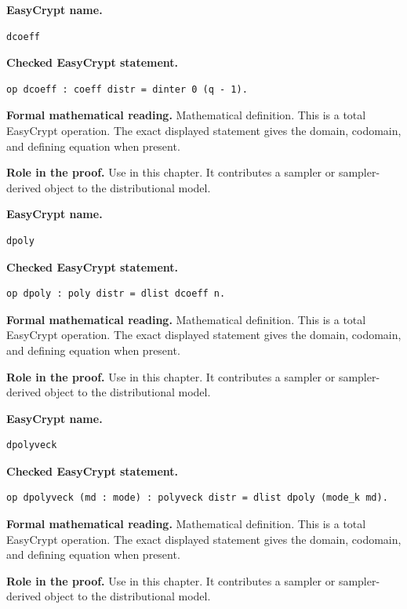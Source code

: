 \begin{formaldefinition}
\noindent\textbf{EasyCrypt name.}
\begin{lstlisting}[language=EasyCrypt,basicstyle=\ttfamily\scriptsize]
dcoeff
\end{lstlisting}
\noindent\textbf{Checked EasyCrypt statement.}
\begin{lstlisting}[language=EasyCrypt,basicstyle=\ttfamily\scriptsize]
op dcoeff : coeff distr = dinter 0 (q - 1).
\end{lstlisting}
\noindent\textbf{Formal mathematical reading.}
Mathematical definition. This is a total EasyCrypt operation.  The exact displayed statement gives the domain, codomain, and defining equation when present.

\noindent\textbf{Role in the proof.}
Use in this chapter. It contributes a sampler or sampler-derived object to the distributional model.

\end{formaldefinition}

\begin{formaldefinition}
\noindent\textbf{EasyCrypt name.}
\begin{lstlisting}[language=EasyCrypt,basicstyle=\ttfamily\scriptsize]
dpoly
\end{lstlisting}
\noindent\textbf{Checked EasyCrypt statement.}
\begin{lstlisting}[language=EasyCrypt,basicstyle=\ttfamily\scriptsize]
op dpoly : poly distr = dlist dcoeff n.
\end{lstlisting}
\noindent\textbf{Formal mathematical reading.}
Mathematical definition. This is a total EasyCrypt operation.  The exact displayed statement gives the domain, codomain, and defining equation when present.

\noindent\textbf{Role in the proof.}
Use in this chapter. It contributes a sampler or sampler-derived object to the distributional model.

\end{formaldefinition}

\begin{formaldefinition}
\noindent\textbf{EasyCrypt name.}
\begin{lstlisting}[language=EasyCrypt,basicstyle=\ttfamily\scriptsize]
dpolyveck
\end{lstlisting}
\noindent\textbf{Checked EasyCrypt statement.}
\begin{lstlisting}[language=EasyCrypt,basicstyle=\ttfamily\scriptsize]
op dpolyveck (md : mode) : polyveck distr = dlist dpoly (mode_k md).
\end{lstlisting}
\noindent\textbf{Formal mathematical reading.}
Mathematical definition. This is a total EasyCrypt operation.  The exact displayed statement gives the domain, codomain, and defining equation when present.

\noindent\textbf{Role in the proof.}
Use in this chapter. It contributes a sampler or sampler-derived object to the distributional model.

\end{formaldefinition}

